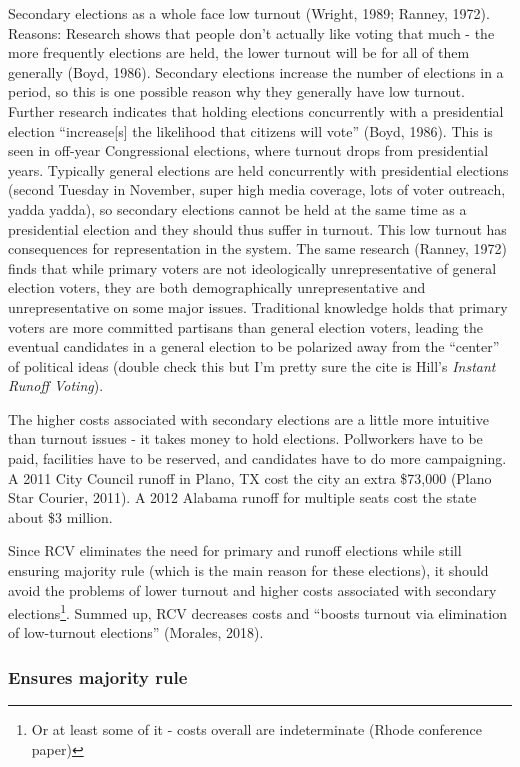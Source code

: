 \documentclass[12pt,twoside]{reedthesis}
\theoremstyle{definition}
\theoremstyle{definition}
\theoremstyle{definition}
\theoremstyle{remark}
\begin{document}
Secondary elections as a whole face low turnout (Wright, 1989; Ranney,
1972). Reasons: Research shows that people don't actually like voting
that much - the more frequently elections are held, the lower turnout
will be for all of them generally (Boyd, 1986). Secondary elections
increase the number of elections in a period, so this is one possible
reason why they generally have low turnout. Further research indicates
that holding elections concurrently with a presidential election
``increase{[}s{]} the likelihood that citizens will vote'' (Boyd, 1986).
This is seen in off-year Congressional elections, where turnout drops
from presidential years. Typically general elections are held
concurrently with presidential elections (second Tuesday in November,
super high media coverage, lots of voter outreach, yadda yadda), so
secondary elections cannot be held at the same time as a presidential
election and they should thus suffer in turnout. This low turnout has
consequences for representation in the system. The same research
(Ranney, 1972) finds that while primary voters are not ideologically
unrepresentative of general election voters, they are both
demographically unrepresentative and unrepresentative on some major
issues. Traditional knowledge holds that primary voters are more
committed partisans than general election voters, leading the eventual
candidates in a general election to be polarized away from the
``center'' of political ideas (double check this but I'm pretty sure the
cite is Hill's \emph{Instant Runoff Voting}).

The higher costs associated with secondary elections are a little more
intuitive than turnout issues - it takes money to hold elections.
Pollworkers have to be paid, facilities have to be reserved, and
candidates have to do more campaigning. A 2011 City Council runoff in
Plano, TX cost the city an extra \$73,000 (Plano Star Courier, 2011). A
2012 Alabama runoff for multiple seats cost the state about \$3 million.

Since RCV eliminates the need for primary and runoff elections while
still ensuring majority rule (which is the main reason for these
elections), it should avoid the problems of lower turnout and higher
costs associated with secondary elections\footnote{Or at least some of
  it - costs overall are indeterminate (Rhode conference paper)}. Summed
up, RCV decreases costs and ``boosts turnout via elimination of
low-turnout elections'' (Morales, 2018).

\hypertarget{ensures-majority-rule}{%
\subsubsection{Ensures majority rule}\label{ensures-majority-rule}}
\end{document}
